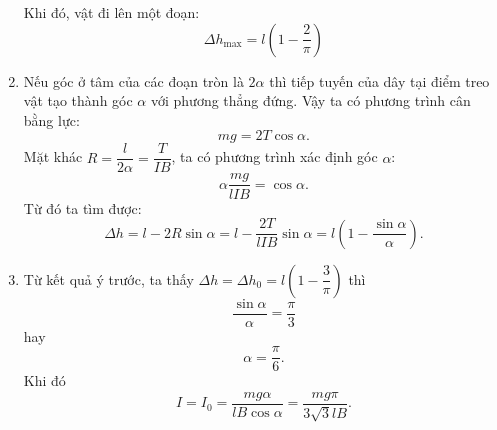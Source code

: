 \begin{loigiai}
\begin{enumerate}[1)]
\begin{center}
        \end{center}
        Khi đó, vật đi lên một đoạn:
        \[\Delta h_{\max}=l\left(1-\dfrac{2}{\pi}\right)\]
        \item Nếu góc ở tâm của các đoạn tròn là $2\alpha$ thì tiếp tuyến của dây tại điểm treo vật tạo thành góc $\alpha$ với phương thẳng đứng. Vậy ta có phương trình cân bằng lực:
        \[mg=2T\cos\alpha.\]
        Mặt khác $R=\dfrac{l}{2\alpha}=\dfrac{T}{IB}$, ta có phương trình xác định góc $\alpha$:
        \[\alpha \dfrac{mg}{lIB}=\cos\alpha.\]
        Từ đó ta tìm được:
        \[\Delta h=l-2R\sin\alpha=l-\dfrac{2T}{lIB}\sin\alpha=l\left(1-\dfrac{\sin\alpha}{\alpha}\right).\]
        \item Từ kết quả ý trước, ta thấy $\Delta h=\Delta h_0=l\left(1-\dfrac{3}{\pi}\right)$
        thì 
        $$\dfrac{\sin\alpha}{\alpha}=\dfrac{\pi}{3}$$
        hay 
        $$\alpha=\dfrac{\pi}{6}.$$
        Khi đó 
        \[I=I_0=\dfrac{mg\alpha}{lB\cos\alpha}=\dfrac{mg\pi}{3\sqrt{3}lB}.\]
    \end{enumerate}
\end{loigiai} 

